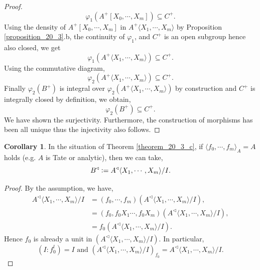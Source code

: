 \documentclass[10pt]{article}
\numberwithin{equation}{section}
\theoremstyle{definition}
\newtheorem{corollary}{Corollary} [subsection]
\newcommand{\defeq}{\vcentcolon=}
\newcommand{\tand}[0]{\text{ and }}
\newcommand{\comppol}[1]{\langle X_1,\cdots, X_{#1}\rangle}
\begin{document}
\begin{proof}
\begin{equation*}
        \varphi_1(A^+[X_0,\cdots,X_m])\subseteq C^+.
    \end{equation*}
    Using the density of $A^+[X_0,\cdots,X_m]$ in $A^+\comppol{m}$ by Proposition \ref{proposition_20_3}.b, the continuity of $\varphi_1$, and $C^+$ is an open subgroup hence also closed, we get
    \begin{equation*}
        \varphi_1(A^+\comppol{m})\subseteq C^+.
    \end{equation*}
    Using the commutative diagram,
    \begin{equation*}
        \varphi_2(A^+\comppol{m})\subseteq C^+.
    \end{equation*}
    Finally $\varphi_2(B^+)$ is integral over $\varphi_2(A^+\comppol{m})$ by construction and $C^+$ is integrally closed by definition, we obtain,
    \begin{equation*}
        \varphi_2(B^+)\subseteq C^+.
    \end{equation*}
    We have shown the surjectivity. Furthermore, the construction of morphisms has been all unique thus the injectivity also follows.
\end{proof}
\begin{corollary}
    \label{corollary_20_3_b}
    In the situation of Theorem \ref{theorem_20_3_c}, if $\langle f_0,\cdots,f_m\rangle_A = A$ holds (e.g. $A$ is Tate or analytic), then we can take,
    \begin{equation*}
        B^\triangleleft \defeq A^\triangleleft\comppol{m}/I.
    \end{equation*}
\end{corollary}
\begin{proof}
    By the assumption, we have,
    \begin{align*}
        A^\triangleleft\comppol{m}/I & = (f_0,\cdots,f_m)(A^\triangleleft\comppol{m}/I),\\
        & = (f_0,f_0X_1\cdots,f_0X_m)(A^\triangleleft\comppol{m}/I),\\
        & = f_0(A^\triangleleft\comppol{m}/I).
    \end{align*}
    Hence $f_0$ is already a unit in $(A^\triangleleft\comppol{m}/I)$. In particular,
    \begin{equation*}
        (I:f_0^l) = I \tand (A^\triangleleft\comppol{m}/I)_{f_0} = A^\triangleleft\comppol{m}/I.
    \end{equation*}
\end{proof}
\end{document}
